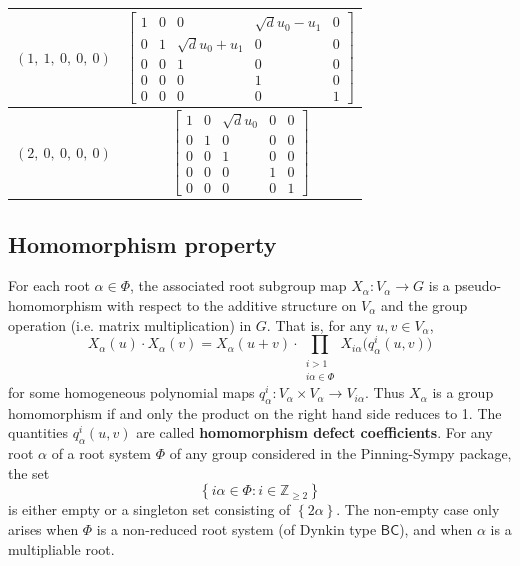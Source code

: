 \documentclass[11pt]{article}
\newcommand{\noi}{\noindent}
\newcommand{\tbf}{\textbf}
\newcommand{\lb}{\left\{}
\newcommand{\rb}{\right\}}
\newcommand{\Z}{\mathbb{Z}}
\theoremstyle{definition}
\begin{document}
\begin{longtable}{|l|c|}
    \hline
    $\left( 1, \  1, \  0, \  0, \  0\right)$ & ${\left[\begin{matrix}1 & 0 & 0 & \sqrt{d} u_{0} - u_{1} & 0\\0 & 1 & \sqrt{d} u_{0} + u_{1} & 0 & 0\\0 & 0 & 1 & 0 & 0\\0 & 0 & 0 & 1 & 0\\0 & 0 & 0 & 0 & 1\end{matrix}\right]}$ \\
    \hline
    $\left( 2, \  0, \  0, \  0, \  0\right)$ & ${\left[\begin{matrix}1 & 0 & \sqrt{d} u_{0} & 0 & 0\\0 & 1 & 0 & 0 & 0\\0 & 0 & 1 & 0 & 0\\0 & 0 & 0 & 1 & 0\\0 & 0 & 0 & 0 & 1\end{matrix}\right]}$ \\
    \hline
\end{longtable}


\subsection{Homomorphism property}

\noi For each root $\alpha \in \Phi$, the associated root subgroup map $X_\alpha:V_\alpha \to G$ is a pseudo-homomorphism with respect to the additive structure on $V_\alpha$ and the group operation (i.e. matrix multiplication) in $G$. That is, for any $u,v \in V_\alpha$,
\begin{equation}
\label{pseudo homomorphism}
	X_\alpha(u) \cdot X_\alpha(v) = X_\alpha(u+v) \cdot \prod_{\substack{i > 1 \\ i \alpha \in \Phi}} X_{i \alpha} \Big( q^i_\alpha(u,v) \Big)
\end{equation}
for some homogeneous polynomial maps $q^i_\alpha:V_\alpha \times V_\alpha \to V_{i \alpha}$. Thus $X_\alpha$ is a group homomorphism if and only the product on the right hand side reduces to 1. The quantities $q^i_\alpha(u,v)$ are called \tbf{homomorphism defect coefficients}. For any root $\alpha$ of a root system $\Phi$ of any group considered in the Pinning-Sympy package, the set
\[
	\lb i \alpha \in \Phi : i \in \Z_{\ge 2} \rb
\]
is either empty or a singleton set consisting of $\lb 2 \alpha \rb$. The non-empty case only arises when $\Phi$ is a non-reduced root system (of Dynkin type $\mathsf{BC}$), and when $\alpha$ is a multipliable root. 
\end{document}
